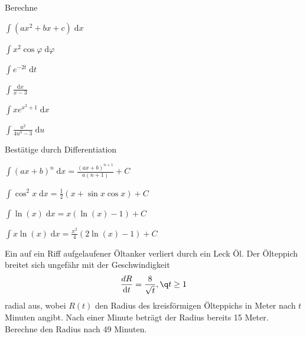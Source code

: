 \documentclass[%
11pt,%
twoside,%
titlepage,%
german,%
headsepline%
]{scrartcl}
\begin{document}
\begin{ueb}[integrieren]
Berechne

\begin{minipage}{0.5\textwidth}
\begin{enumeratea}
\item $\int (ax^2+bx+c)\;\mathrm{d}x$
\item $\int x^2\cos\varphi\;\mathrm{d}\varphi$
\item $\int e^{-2t}\;\mathrm{d}t$
\end{enumeratea}
\end{minipage}
\begin{minipage}{0.5\textwidth}
\begin{enumeratea}
\setcounter{enumi}{3}
\item $\int\frac{\mathrm{d}x}{x-3}$
\item $\int xe^{x^2+1}\;\mathrm{d}x$
\item $\int\frac{u^2}{4u^3-3}\;\mathrm{d}u$
\end{enumeratea}
\end{minipage}
\end{ueb}

\begin{ueb}[Umkehrung]
Bestätige durch Differentiation

\begin{minipage}{0.5\textwidth}
\begin{enumeratea}
\item $\int (ax+b)^n\;\mathrm{d}x=\frac{(ax+b)^{n+1}}{a(n+1)}+C$
\item $\int \cos^2x\;\mathrm{d}x=\frac{1}{2}(x+\sin x\cos x)+C$
\end{enumeratea}
\end{minipage}
\begin{minipage}{0.5\textwidth}
\begin{enumeratea}
\setcounter{enumi}{2}
\item $\int\ln(x)\;\mathrm{d}x=x(\ln( x)-1)+C$
\item $\int x\ln (x)\;\mathrm{d}x=\frac{x^2}{4}(2\ln(x)-1)+C$
\end{enumeratea}
\end{minipage}
\end{ueb}

\begin{ueb}[Öl]
Ein auf ein Riff aufgelaufener Öltanker verliert durch ein Leck Öl. Der Ölteppich breitet sich ungefähr mit der Geschwindigkeit
$$\frac{dR}{\mathrm{d}t}=\frac{8}{\sqrt{t}},\q t\geq1$$
radial aus, wobei $R(t)$ den Radius des kreisförmigen Ölteppichs in Meter nach $t$ Minuten angibt. Nach einer Minute beträgt der Radius bereits 15 Meter. Berechne den Radius nach 49 Minuten.
\end{ueb}
\end{document}
